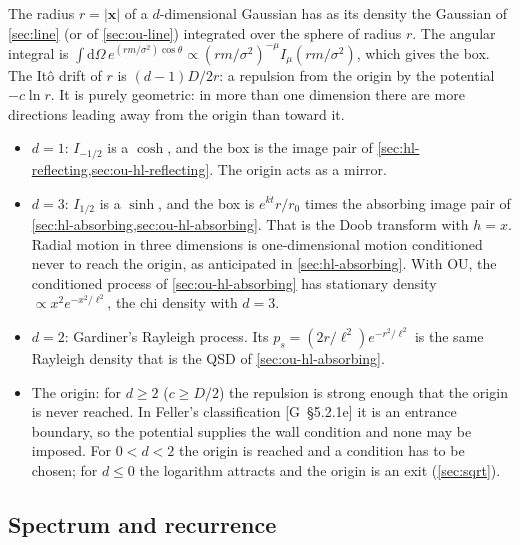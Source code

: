 \documentclass[11pt]{article}
\numberwithin{equation}{section}
\newcommand{\dd}{\mathrm{d}}
\newcommand{\Gs}[1]{[G~\S#1]}
\begin{document}
The radius $r=|\mathbf x|$ of a $d$-dimensional Gaussian has as its density the Gaussian of \cref{sec:line} (or of
\cref{sec:ou-line}) integrated over the sphere of radius $r$. The angular integral is
$\int\dd\Omega\,e^{(rm/\sigma^2)\cos\theta}\propto(rm/\sigma^2)^{-\mu}I_\mu(rm/\sigma^2)$, which gives the box. The
Itô drift of $r$ is $(d-1)D/2r$: a repulsion from the origin by the potential $-c\ln r$. It is purely geometric:
in more than one dimension there are more directions leading away from the origin than toward it.
\begin{itemize}
  \item $d=1$: $I_{-1/2}$ is a $\cosh$, and the box is the image pair of
        \cref{sec:hl-reflecting,sec:ou-hl-reflecting}. The origin acts as a mirror.
  \item $d=3$: $I_{1/2}$ is a $\sinh$, and the box is $e^{kt}r/r_0$ times the absorbing image pair of
        \cref{sec:hl-absorbing,sec:ou-hl-absorbing}. That is the Doob transform with $h=x$. Radial motion in three
        dimensions is one-dimensional motion conditioned never to reach the origin, as anticipated in
        \cref{sec:hl-absorbing}. With OU, the conditioned process of \cref{sec:ou-hl-absorbing} has stationary
        density $\propto x^2e^{-x^2/\ell^2}$, the chi density with $d=3$.
  \item $d=2$: Gardiner's Rayleigh process. Its $p_s=(2r/\ell^2)e^{-r^2/\ell^2}$ is the same Rayleigh density that
        is the QSD of \cref{sec:ou-hl-absorbing}.
  \item The origin: for $d\ge2$ ($c\ge D/2$) the repulsion is strong enough that the origin is never reached. In
        Feller's classification \Gs{5.2.1e} it is an entrance boundary, so the potential supplies the wall
        condition and none may be imposed. For $0<d<2$ the origin is reached and a condition has to be chosen; for
        $d\le0$ the logarithm attracts and the origin is an exit (\cref{sec:sqrt}).
\end{itemize}

\subsection{Spectrum and recurrence}
\end{document}
